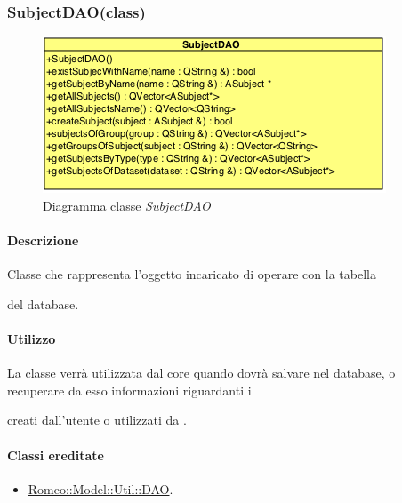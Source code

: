 \subsubsection{SubjectDAO(class)}
\label{spesubjectdao}
\begin{figure}[!h]
\centering
			\includegraphics[scale=1]{./Content/Immagini/model/SubjectDAO.png}
			\caption{Diagramma classe \textsl{SubjectDAO}}
			\label{cl_subjectdao}
\end{figure}
\paragraph{Descrizione \\}
Classe che rappresenta l'oggetto incaricato di operare con la tabella \subject{} del database.
\paragraph{Utilizzo\\}
La classe verrà utilizzata dal core quando dovrà salvare nel database, o recuperare da esso informazioni riguardanti i \subject{} creati dall'utente o utilizzati da \project.
\paragraph{Classi ereditate\\}
\begin{itemize}
\item \hyperref[speadatabase]{Romeo::Model::Util::DAO}.
\end{itemize}
